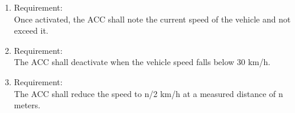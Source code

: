\begin{enumerate}[label*=\arabic*.]
        \item \label{req.11} Requirement: \\
        Once activated, the ACC shall note the current speed of the vehicle and not exceed it. \\
        \item \label{req.12} Requirement: \\
        The ACC shall deactivate when the vehicle speed falls below 30 km/h. \\
        \item \label{req.13} Requirement: \\
        The ACC shall reduce the speed to n/2 km/h at a measured distance of n meters. \\
	 \end{enumerate}












